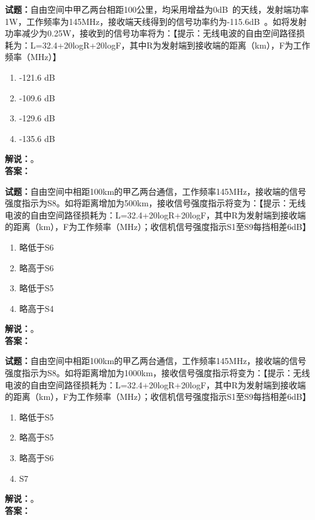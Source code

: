 \documentclass{ctexbook}
\begin{document}
\noindent\textbf{试题：}自由空间中甲乙两台相距100公里，均采用增益为0\unit[qualifier-mode=combine]{\deci\bel{}}的天线，发射端功率1W，工作频率为145\unit{\MHz}，接收端天线得到的信号功率约为-115.6\unit[qualifier-mode=combine]{\deci\bel{}}。如将发射功率减少为0.25W，接收到的信号功率将为：【提示：无线电波的自由空间路径损耗为：L=32.4+20logR+20logF，其中R为发射端到接收端的距离（km），F为工作频率（\unit{\MHz}）】
\begin{enumerate}[leftmargin=3em]
  \item -121.6 \unit[qualifier-mode=combine]{\deci\bel{}}
  \item -109.6 \unit[qualifier-mode=combine]{\deci\bel{}}
  \item -129.6 \unit[qualifier-mode=combine]{\deci\bel{}}
  \item -135.6 \unit[qualifier-mode=combine]{\deci\bel{}}
\end{enumerate}
\noindent\textbf{解说：}\textbf{}。\\\noindent\textbf{答案：}

\vspace{\baselineskip}

\noindent\textbf{试题：}自由空间中相距100km的甲乙两台通信，工作频率145\unit{\MHz}，接收端的信号强度指示为S8。如将距离增加为500km，接收信号强度指示将变为：【提示：无线电波的自由空间路径损耗为：L=32.4+20logR+20logF，其中R为发射端到接收端的距离（km），F为工作频率（\unit{\MHz}）；收信机信号强度指示S1至S9每挡相差6dB】
\begin{enumerate}[leftmargin=3em]
  \item 略低于S6
  \item 略高于S6
  \item 略低于S5
  \item 略高于S4
\end{enumerate}
\noindent\textbf{解说：}\textbf{}。\\\noindent\textbf{答案：}

\vspace{\baselineskip}

\noindent\textbf{试题：}自由空间中相距100km的甲乙两台通信，工作频率145\unit{\MHz}，接收端的信号强度指示为S8。如将距离增加为1000km，接收信号强度指示将变为：【提示：无线电波的自由空间路径损耗为：L=32.4+20logR+20logF，其中R为发射端到接收端的距离（km），F为工作频率（\unit{\MHz}）；收信机信号强度指示S1至S9每挡相差6dB】
\begin{enumerate}[leftmargin=3em]
  \item 略低于S5
  \item 略高于S5
  \item 略高于S6
  \item S7
\end{enumerate}
\noindent\textbf{解说：}\textbf{}。\\\noindent\textbf{答案：}
\end{document}
